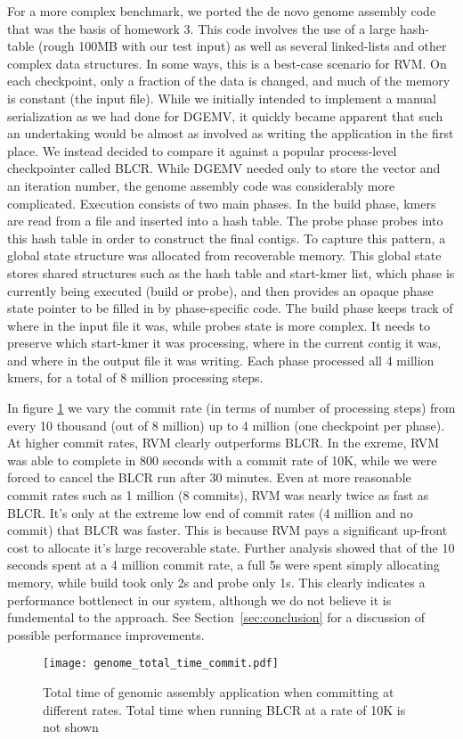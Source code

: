 For a more complex benchmark, we ported the de novo genome assembly code that
was the basis of homework 3. This code involves the use of a large hash-table
(rough 100MB with our test input) as well as several linked-lists and other
complex data structures. In some ways, this is a best-case scenario for RVM. On
each checkpoint, only a fraction of the data is changed, and much of the memory
is constant (the input file). While we initially intended to implement a manual
serialization as we had done for DGEMV, it quickly became apparent that such an
undertaking would be almost as involved as writing the application in the first
place. We instead decided to compare it against a popular process-level
checkpointer called BLCR\cite{BLCR}. While DGEMV needed only to store the vector
and an iteration number, the genome assembly code was considerably more
complicated. Execution consists of two main phases. In the build phase, kmers
are read from a file and inserted into a hash table. The probe phase probes into
this hash table in order to construct the final contigs. To capture this
pattern, a global state structure was allocated from recoverable memory. This
global state stores shared structures such as the hash table and start-kmer
list, which phase is currently being executed (build or probe), and then
provides an opaque phase state pointer to be filled in by phase-specific code.
 The build phase keeps track of where in the input file it was, while probes
state is more complex. It needs to preserve which start-kmer it was
processing, where in the current contig it was, and where in the output file it
was writing. Each phase processed all 4 million kmers, for a total of 8 million
processing steps.

In figure \ref{fig:genome_total_time_commit} we vary the commit rate (in terms
of number of processing steps) from every 10 thousand (out of 8 million) up to
4 million (one checkpoint per phase). At higher commit rates, RVM clearly
outperforms BLCR. In the exreme, RVM was able to complete in 800 seconds with a
commit rate of 10K, while we were forced to cancel the BLCR run after 30
minutes. Even at more reasonable commit rates such as 1 million (8 commits),
RVM was nearly twice as fast as BLCR. It's only at the extreme low end of
commit rates (4 million and no commit) that BLCR was faster. This is because
RVM pays a significant up-front cost to allocate it's large recoverable state.
Further analysis showed that of the 10 seconds spent at a 4 million commit
rate, a full 5s were spent simply allocating memory, while build took only 2s
and probe only 1s. This clearly indicates a performance bottlenect in our
system, although we do not believe it is fundemental to the approach. See
Section~\ref{sec:conclusion} for a discussion of possible performance
improvements. 

\begin{figure}[t!]
\begin{center}
\texttt{[image: genome\_total\_time\_commit.pdf]}
\end{center}
\caption{Total time of genomic assembly application when committing at different rates. Total time when running BLCR at a rate of 10K is not shown}
\label{fig:genome_total_time_commit}
\end{figure}
